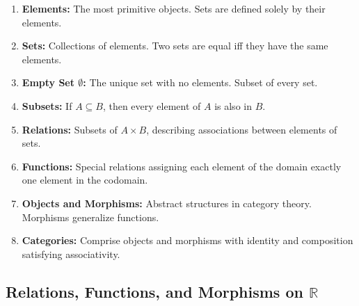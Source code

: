 \documentclass[10pt]{article}
\theoremstyle{plain}
\theoremstyle{definition}
\begin{document}
  \begin{enumerate}
  	\item \textbf{Elements:} The most primitive objects. Sets are defined solely by their elements.
  	\item \textbf{Sets:} Collections of elements. Two sets are equal iff they have the same elements.
  	\item \textbf{Empty Set \(\emptyset\):} The unique set with no elements. Subset of every set.
  	\item \textbf{Subsets:} If \( A \subseteq B \), then every element of \( A \) is also in \( B \).
  	\item \textbf{Relations:} Subsets of \( A \times B \), describing associations between elements of sets.
  	\item \textbf{Functions:} Special relations assigning each element of the domain exactly one element in the codomain.
  	\item \textbf{Objects and Morphisms:} Abstract structures in category theory. Morphisms generalize functions.
  	\item \textbf{Categories:} Comprise objects and morphisms with identity and composition satisfying associativity.
  \end{enumerate}
  
  \vspace{1em}
  \subsection*{Relations, Functions, and Morphisms on \(\mathbb{R}\)}
  
\end{document}
